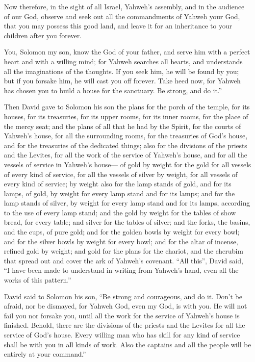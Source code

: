 Now therefore, in the sight of all Israel, Yahweh's
assembly, and in the audience of our God, observe and seek out all the
commandments of Yahweh your God, that you may possess this good land,
and leave it for an inheritance to your children after you forever.

 You, Solomon my son, know the God of your father, and serve
him with a perfect heart and with a willing mind; for Yahweh searches
all hearts, and understands all the imaginations of the thoughts. If you
seek him, he will be found by you; but if you forsake him, he will cast
you off forever.  Take heed now, for Yahweh has chosen you
to build a house for the sanctuary. Be strong, and do it.''

 Then David gave to Solomon his son the plans for the porch
of the temple, for its houses, for its treasuries, for its upper rooms,
for its inner rooms, for the place of the mercy seat;  and
the plans of all that he had by the Spirit, for the courts of Yahweh's
house, for all the surrounding rooms, for the treasuries of God's house,
and for the treasuries of the dedicated things;  also for
the divisions of the priests and the Levites, for all the work of the
service of Yahweh's house, and for all the vessels of service in
Yahweh's house---  of gold by weight for the gold for all
vessels of every kind of service, for all the vessels of silver by
weight, for all vessels of every kind of service;  by
weight also for the lamp stands of gold, and for its lamps, of gold, by
weight for every lamp stand and for its lamps; and for the lamp stands
of silver, by weight for every lamp stand and for its lamps, according
to the use of every lamp stand;  and the gold by weight for
the tables of show bread, for every table; and silver for the tables of
silver;  and the forks, the basins, and the cups, of pure
gold; and for the golden bowls by weight for every bowl; and for the
silver bowls by weight for every bowl;  and for the altar
of incense, refined gold by weight; and gold for the plans for the
chariot, and the cherubim that spread out and cover the ark of Yahweh's
covenant.  ``All this'', David said, ``I have been made to
understand in writing from Yahweh's hand, even all the works of this
pattern.''

 David said to Solomon his son, ``Be strong and courageous,
and do it. Don't be afraid, nor be dismayed, for Yahweh God, even my
God, is with you. He will not fail you nor forsake you, until all the
work for the service of Yahweh's house is finished. 
Behold, there are the divisions of the priests and the Levites for all
the service of God's house. Every willing man who has skill for any kind
of service shall be with you in all kinds of work. Also the captains and
all the people will be entirely at your command.''

